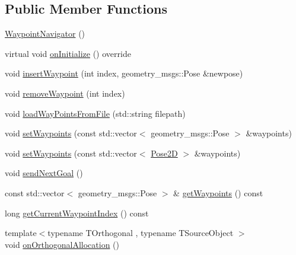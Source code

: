 \subsection*{Public Member Functions}
\begin{DoxyCompactItemize}
\item 
\hyperlink{classcl__move__base__z_1_1WaypointNavigator_a62d2f964f5537e17f94317c2f69c8969}{Waypoint\+Navigator} ()
\item 
virtual void \hyperlink{classcl__move__base__z_1_1WaypointNavigator_ac60ecf63f7a2a84f3ef51f04cc222a70}{on\+Initialize} () override
\item 
void \hyperlink{classcl__move__base__z_1_1WaypointNavigator_a5d40e7942620c3c191e2a3bd75845069}{insert\+Waypoint} (int index, geometry\+\_\+msgs\+::\+Pose \&newpose)
\item 
void \hyperlink{classcl__move__base__z_1_1WaypointNavigator_a0a7e9e35ed5ba02ff4cfb580ffa25e9a}{remove\+Waypoint} (int index)
\item 
void \hyperlink{classcl__move__base__z_1_1WaypointNavigator_a18d74467ddf0e637a8d5a6e1fa2e93db}{load\+Way\+Points\+From\+File} (std\+::string filepath)
\item 
void \hyperlink{classcl__move__base__z_1_1WaypointNavigator_a477992dbb2eca9ee77a396d0fe1b084b}{set\+Waypoints} (const std\+::vector$<$ geometry\+\_\+msgs\+::\+Pose $>$ \&waypoints)
\item 
void \hyperlink{classcl__move__base__z_1_1WaypointNavigator_aa164ff2510b9549b0b73df6eb18a7a4f}{set\+Waypoints} (const std\+::vector$<$ \hyperlink{structcl__move__base__z_1_1Pose2D}{Pose2D} $>$ \&waypoints)
\item 
void \hyperlink{classcl__move__base__z_1_1WaypointNavigator_a1e0a8ff536d2d01a01063fd903029347}{send\+Next\+Goal} ()
\item 
const std\+::vector$<$ geometry\+\_\+msgs\+::\+Pose $>$ \& \hyperlink{classcl__move__base__z_1_1WaypointNavigator_a553cdd4ddc20ff26c1bdcb6dad42911f}{get\+Waypoints} () const
\item 
long \hyperlink{classcl__move__base__z_1_1WaypointNavigator_a753c3df56b96c49438a361d3e5234f79}{get\+Current\+Waypoint\+Index} () const
\item 
{\footnotesize template$<$typename T\+Orthogonal , typename T\+Source\+Object $>$ }\\void \hyperlink{classcl__move__base__z_1_1WaypointNavigator_aa41d28f71eccc3a61932d09f8ea8f5f5}{on\+Orthogonal\+Allocation} ()
\end{DoxyCompactItemize}
